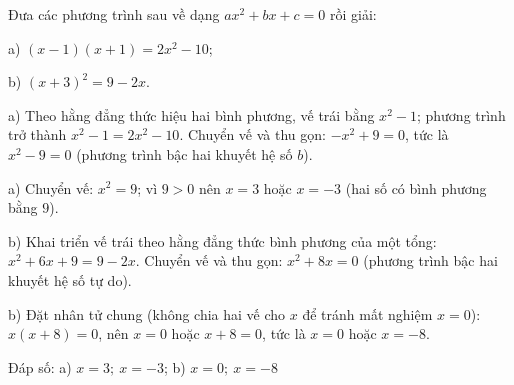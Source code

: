 \begin{problem}[9DS-PT2-011]
Đưa các phương trình sau về dạng $ax^2 + bx + c = 0$ rồi giải:

a) $(x - 1)(x + 1) = 2x^2 - 10$;

b) $(x + 3)^2 = 9 - 2x$.

\begin{solution}
a) Theo hằng đẳng thức hiệu hai bình phương, vế trái bằng $x^2 - 1$; phương trình trở thành $x^2 - 1 = 2x^2 - 10$. Chuyển vế và thu gọn: $-x^2 + 9 = 0$, tức là $x^2 - 9 = 0$ (phương trình bậc hai khuyết hệ số $b$).

a) Chuyển vế: $x^2 = 9$; vì $9 > 0$ nên $x = 3$ hoặc $x = -3$ (hai số có bình phương bằng $9$).

b) Khai triển vế trái theo hằng đẳng thức bình phương của một tổng: $x^2 + 6x + 9 = 9 - 2x$. Chuyển vế và thu gọn: $x^2 + 8x = 0$ (phương trình bậc hai khuyết hệ số tự do).

b) Đặt nhân tử chung (không chia hai vế cho $x$ để tránh mất nghiệm $x = 0$): $x(x + 8) = 0$, nên $x = 0$ hoặc $x + 8 = 0$, tức là $x = 0$ hoặc $x = -8$.

Đáp số: a) $\boxed{x = 3;\ x = -3}$; b) $\boxed{x = 0;\ x = -8}$
\end{solution}
\end{problem}

